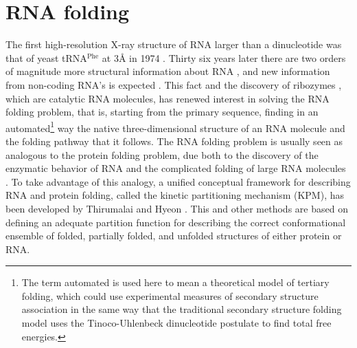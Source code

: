 \section{RNA folding}
The first  high-resolution X-ray structure  of RNA larger
than a dinucleotide was  that of yeast tRNA$^{\textrm{Phe}}$ at 3{\AA}
in  1974 \cite{robertus1974,  kim1974, stout1976}.   Thirty  six years
later there  are two orders  of magnitude more  structural information
about RNA \cite{noller2005}, and new information from non-coding RNA's
is  expected  \cite{weinberg2009}.  This  fact  and  the discovery  of
ribozymes  \cite{kruger1982,  takada1983},  which  are  catalytic  RNA
molecules, has  renewed interest in solving  the RNA folding  problem,  that is,  starting  from  the primary  sequence,
finding in  an automated\footnote{The term  automated is used  here to
  mean  a  theoretical model  of  tertiary  folding,  which could  use
  experimental measures of secondary structure association in the same
  way   that  the  traditional   secondary  structure   folding  model
  \cite{zuker1989,    hofacker1994}    uses    the    Tinoco-Uhlenbeck
  dinucleotide   postulate  \cite{borer1974}   to   find  total   free
  energies.}   way the  native three-dimensional  structure of  an RNA
molecule  and   the  folding  pathway   that  it  follows.    The  RNA
folding problem is usually seen as analogous to the
protein folding  problem, due both  to the discovery of  the enzymatic
behavior  of  RNA \cite{kruger1982,  takada1983}  and the  complicated
folding of large RNA molecules \cite{batey1999}.  To take advantage of
this analogy,  a unified conceptual  framework for describing  RNA and
protein folding, called the  kinetic partitioning mechanism (KPM), has
been developed by Thirumalai and Hyeon \cite{thirumalai2005}. This and
other methods are based on defining an adequate partition function for
describing  the correct conformational  ensemble of  folded, partially
folded,    and   unfolded    structures    \cite{chen1995,   chen1998,
  thirumalai1996} of either protein or RNA.

